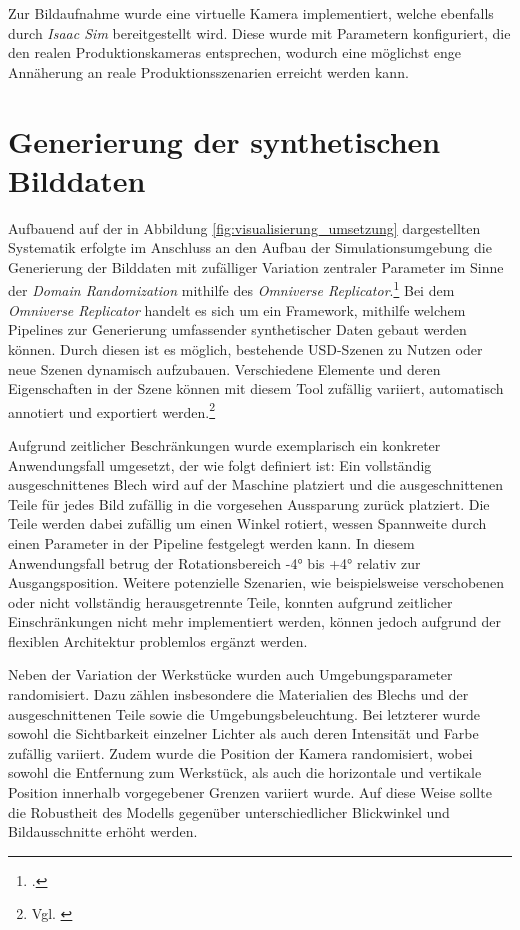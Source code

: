 Zur Bildaufnahme wurde eine virtuelle Kamera implementiert, welche ebenfalls durch \textit{Isaac Sim} bereitgestellt wird. Diese wurde mit Parametern konfiguriert, die den realen Produktionskameras entsprechen, wodurch eine möglichst enge Annäherung an reale Produktionsszenarien erreicht werden kann.


\section{Generierung der synthetischen Bilddaten}

Aufbauend auf der in Abbildung \ref{fig:visualisierung_umsetzung} dargestellten Systematik erfolgte im Anschluss an den Aufbau der Simulationsumgebung die Generierung der Bilddaten mit zufälliger Variation zentraler Parameter im Sinne der \textit{Domain Randomization} mithilfe des \textit{Omniverse Replicator}.\footcite{nvidia_replicator_2025}
Bei dem \textit{Omniverse Replicator} handelt es sich um ein Framework, mithilfe welchem Pipelines zur Generierung umfassender synthetischer Daten gebaut werden können. Durch diesen ist es möglich, bestehende USD-Szenen zu Nutzen oder neue Szenen dynamisch aufzubauen. Verschiedene Elemente und deren Eigenschaften in der Szene können mit diesem Tool zufällig variiert, automatisch annotiert und exportiert werden.\footnote{Vgl. \cite{nvidia_replicator_2025}}

Aufgrund zeitlicher Beschränkungen wurde exemplarisch ein konkreter Anwendungsfall umgesetzt, der wie folgt definiert ist:
Ein vollständig ausgeschnittenes Blech wird auf der Maschine platziert und die ausgeschnittenen Teile für jedes Bild zufällig in die vorgesehen Aussparung zurück platziert. Die Teile werden dabei zufällig um einen Winkel rotiert, wessen Spannweite durch einen Parameter in der Pipeline festgelegt werden kann. In diesem Anwendungsfall betrug der Rotationsbereich -4° bis +4° relativ zur Ausgangsposition. Weitere potenzielle Szenarien, wie beispielsweise verschobenen oder nicht vollständig herausgetrennte Teile, konnten aufgrund zeitlicher Einschränkungen nicht mehr implementiert werden, können jedoch aufgrund der flexiblen Architektur problemlos ergänzt werden.

Neben der Variation der Werkstücke wurden auch Umgebungsparameter randomisiert. Dazu zählen insbesondere die Materialien des Blechs und der ausgeschnittenen Teile sowie die Umgebungsbeleuchtung. Bei letzterer wurde sowohl die Sichtbarkeit einzelner Lichter als auch deren Intensität und Farbe zufällig variiert. Zudem wurde die Position der Kamera randomisiert, wobei sowohl die Entfernung zum Werkstück, als auch die horizontale und vertikale Position innerhalb vorgegebener Grenzen variiert wurde. Auf diese Weise sollte die Robustheit des Modells gegenüber unterschiedlicher Blickwinkel und Bildausschnitte erhöht werden.

